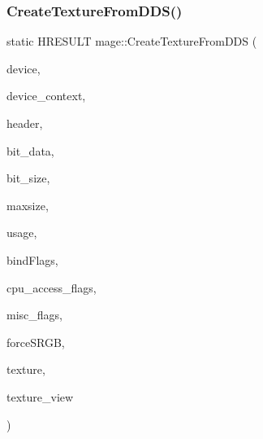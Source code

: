 \hypertarget{namespacemage_a53fb464961d52002316f17c59ce58078}{}\label{namespacemage_a53fb464961d52002316f17c59ce58078} 
\subsubsection{\texorpdfstring{Create\+Texture\+From\+D\+D\+S()}{CreateTextureFromDDS()}}
{\footnotesize\ttfamily static H\+R\+E\+S\+U\+LT mage\+::\+Create\+Texture\+From\+D\+DS (\begin{DoxyParamCaption}\item[{\+\_\+\+In\+\_\+ I\+D3\+D11\+Device2 $\ast$}]{device,  }\item[{\+\_\+\+In\+\_\+opt\+\_\+ I\+D3\+D11\+Device\+Context $\ast$}]{device\+\_\+context,  }\item[{\+\_\+\+In\+\_\+ const \hyperlink{structmage_1_1_d_d_s___h_e_a_d_e_r}{D\+D\+S\+\_\+\+H\+E\+A\+D\+ER} $\ast$}]{header,  }\item[{\+\_\+\+In\+\_\+reads\+\_\+bytes\+\_\+(bit\+\_\+size) const uint8\+\_\+t $\ast$}]{bit\+\_\+data,  }\item[{\+\_\+\+In\+\_\+ size\+\_\+t}]{bit\+\_\+size,  }\item[{\+\_\+\+In\+\_\+ size\+\_\+t}]{maxsize,  }\item[{\+\_\+\+In\+\_\+ D3\+D11\+\_\+\+U\+S\+A\+GE}]{usage,  }\item[{\+\_\+\+In\+\_\+ uint32\+\_\+t}]{bind\+Flags,  }\item[{\+\_\+\+In\+\_\+ uint32\+\_\+t}]{cpu\+\_\+access\+\_\+flags,  }\item[{\+\_\+\+In\+\_\+ uint32\+\_\+t}]{misc\+\_\+flags,  }\item[{\+\_\+\+In\+\_\+ bool}]{force\+S\+R\+GB,  }\item[{\+\_\+\+Outptr\+\_\+opt\+\_\+ I\+D3\+D11\+Resource $\ast$$\ast$}]{texture,  }\item[{\+\_\+\+Outptr\+\_\+opt\+\_\+ I\+D3\+D11\+Shader\+Resource\+View $\ast$$\ast$}]{texture\+\_\+view }\end{DoxyParamCaption})\hspace{0.3cm}{\ttfamily [static]}}

\hypertarget{namespacemage_a4ee2d46e5220246892bb34b7d1e97fbe}{}\label{namespacemage_a4ee2d46e5220246892bb34b7d1e97fbe} 

